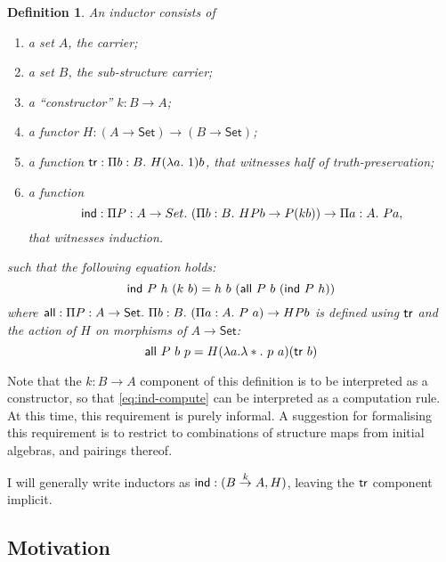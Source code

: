 \documentclass{amsart}
\newtheorem{definition}{Definition}
\newcommand{\Set}{\mathsf{Set}}
\begin{document}
\begin{definition}
  An inductor consists of
  \begin{enumerate}
  \item a set $A$, the carrier;
  \item a set $B$, the sub-structure carrier;
  \item a ``constructor'' $k : B \to A$;
  \item a functor $H : (A \to \Set) \to (B \to \Set)$;
  \item a function $\truth : \Pi b : B.\ H(\lambda a.\ 1)b$, that
    witnesses half of truth-preservation;
  \item a function
    \begin{displaymath}
      \mathsf{ind} : \Pi P : A \to Set.\ (\Pi b : B.\ H P b \to P (k b)) \to \Pi a : A.\ P a,
    \end{displaymath}
    that witnesses induction.
  \end{enumerate}
  such that the following equation holds:
  \begin{equation}\label{eq:ind-compute}
    \mathsf{ind}\ P\ h\ (k\ b) = h\ b\ (\mathsf{all}\ P\ b\ (\mathsf{ind}\ P\ h)) 
  \end{equation}
  where $\all : \Pi P : A \to \Set.\ \Pi b : B.\ (\Pi a : A.\ P\ a) \to H P b$ is defined
  using $\mathsf{tr}$ and the action of $H$ on morphisms of $A \to \Set$:
  \begin{displaymath}
    \all\ P\ b\ p = H (\lambda a. \lambda *.\ p\ a) (\truth\ b)
  \end{displaymath}
\end{definition}

Note that the $k : B \to A$ component of this definition is to be
interpreted as a constructor, so that \autoref{eq:ind-compute} can be
interpreted as a computation rule. At this time, this requirement is
purely informal. A suggestion for formalising this requirement is to
restrict to combinations of structure maps from initial algebras, and
pairings thereof.

I will generally write inductors as $\mathsf{ind} : (B \stackrel{k}\to A, H)$,
leaving the $\mathsf{tr}$ component implicit.

\subsection{Motivation}
\end{document}
